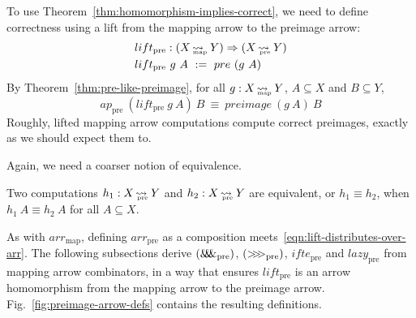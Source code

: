 \documentclass{llncs}
\newcommand{\figref}[1]{Fig.~\ref{#1}}
\newcommand{\arrow}{\rightsquigarrow}
\newcommand{\arrowlift}{\ensuremath{lift}}
\newcommand{\arrowarr}{\ensuremath{arr}}
\newcommand{\arrowcomp}{\ensuremath{{>}\mspace{-6mu}{>}\mspace{-6mu}{>}}}
\newcommand{\arrowpair}{\ensuremath{\mathit{\&\mspace{-7.5mu}\&\mspace{-7.5mu}\&}}}
\newcommand{\arrowif}{\ensuremath{ifte}}
\newcommand{\arrowlazy}{\ensuremath{lazy}}
\newcommand{\map}{_\mathrm{map}}
\DeclareMathOperator{\mapto}{\arrow_{\mspace{-21mu}\map}}
\newcommand{\arrmap}{\arrowarr\map}
\newcommand{\pre}{_\mathrm{pre}}
\DeclareMathOperator{\preto}{\arrow_{\mspace{-19mu}\pre}}
\newcommand{\liftpre}{\arrowlift\pre}
\newcommand{\arrpre}{\arrowarr\pre}
\newcommand{\comppre}{\arrowcomp\pre}
\newcommand{\pairpre}{\arrowpair\pre}
\newcommand{\ifpre}{\arrowif\pre}
\newcommand{\lazypre}{\arrowlazy\pre}
\begin{document}
To use Theorem~\ref{thm:homomorphism-implies-correct}, we need to define correctness using a lift from the mapping arrow to the preimage arrow:
\begin{equation}
\begin{aligned}
	&\liftpre : (X \mapto Y) \tto (X \preto Y) \\
	&\liftpre~g~A \ := \ pre~(g~A)
\end{aligned}
\end{equation}
By Theorem~\ref{thm:pre-like-preimage}, for all $g : X \mapto Y$, $A \subseteq X$ and $B \subseteq Y$,
\begin{equation}
	ap\pre~(\liftpre~g~A)~B \ \equiv \ preimage~(g~A)~B
\end{equation}
Roughly, lifted mapping arrow computations compute correct preimages, exactly as we should expect them to.

Again, we need a coarser notion of equivalence.

\begin{definition}
Two computations $h_1 : X \preto Y$ and $h_2 : X \preto Y$ are equivalent, or $h_1 \equiv h_2$, when 
$h_1~A \equiv h_2~A$ for all $A \subseteq X$.
\end{definition}

As with $\arrmap$, defining $\arrpre$ as a composition meets~\eqref{eqn:lift-distributes-over-arr}.
The following subsections derive $(\pairpre)$, $(\comppre)$, $\ifpre$ and $\lazypre$ from mapping arrow combinators, in a way that ensures $\liftpre$ is an arrow homomorphism from the mapping arrow to the preimage arrow. \figref{fig:preimage-arrow-defs} contains the resulting definitions.
\end{document}
